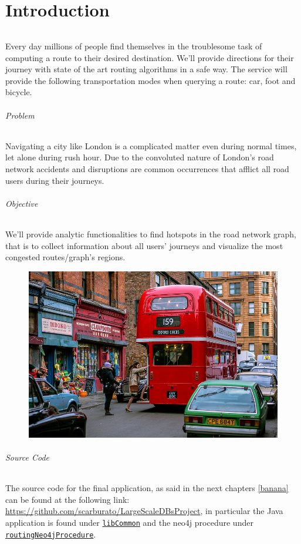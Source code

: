 \part{Introduction}

\paragraph{}
Every day millions of people find themselves in the troublesome task of 
computing a route to their desired destination. We'll provide directions for 
their journey with state of the art routing algorithms in a safe way. The 
service will provide the following transportation modes when querying a route: 
car, foot and bicycle.

\paragraph{Problem}
Navigating a city like London is a complicated matter even during normal times, 
let alone during rush hour. Due to the convoluted nature of London’s road 
network accidents and disruptions are common occurrences that afflict all road 
users during their journeys.

\paragraph{Objective}
We’ll provide analytic functionalities to find hotspots in the road network 
graph, that is to collect information about all users' journeys and visualize 
the most congested routes/graph’s regions.

\begin{figure}[H]
	\centering
	\includegraphics[width=0.9\linewidth]{assets/londontraffic.jpg}
\end{figure}

\paragraph{Source Code}
The source code for the final application, as said in the next chapters 
\ref{banana} can be found at the following link: 
\url{https://github.com/scarburato/LargeScaleDBsProject}, in particular the 
Java application is found under 
\href{https://github.com/scarburato/LargeScaleDBsProject/tree/master/src/libCommon}
{\texttt{libCommon}}
and the neo4j procedure under 
\href{https://github.com/scarburato/neo4jpoormensAstar/tree/9cdfe3be44639d788bac4bfa2f8371f6826b828c}
{\texttt{routingNeo4jProcedure}}.


